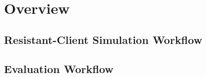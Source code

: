 \section{Overview}\label{s:overview}

\subsection{Resistant-Client Simulation Workflow}

\subsection{Evaluation Workflow}




